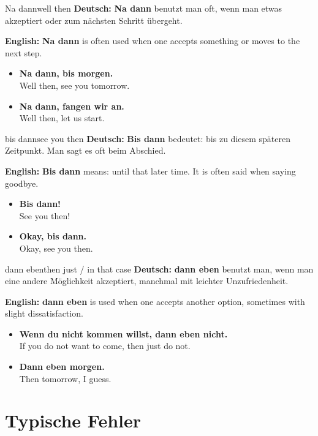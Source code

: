 \documentclass[a4paper,11pt]{article}
\newcommand{\GermanText}[1]{\textbf{Deutsch: }#1\par}
\newcommand{\EnglishText}[1]{{\small\color{SoftGray}\textbf{English: }#1\par}}
\newcommand{\ExampleItem}[2]{\item \textbf{#1}\\{\small\color{SoftGray}#2}}
\begin{document}
\begin{grammarentry}{Na dann}{well then}
\GermanText{\textbf{Na dann} benutzt man oft, wenn man etwas akzeptiert oder zum nächsten Schritt übergeht.}
\EnglishText{\textbf{Na dann} is often used when one accepts something or moves to the next step.}

\begin{exbox}
\begin{itemize}
    \ExampleItem{Na dann, bis morgen.}{Well then, see you tomorrow.}
    \ExampleItem{Na dann, fangen wir an.}{Well then, let us start.}
\end{itemize}
\end{exbox}
\end{grammarentry}

\begin{grammarentry}{bis dann}{see you then}
\GermanText{\textbf{Bis dann} bedeutet: bis zu diesem späteren Zeitpunkt. Man sagt es oft beim Abschied.}
\EnglishText{\textbf{Bis dann} means: until that later time. It is often said when saying goodbye.}

\begin{exbox}
\begin{itemize}
    \ExampleItem{Bis dann!}{See you then!}
    \ExampleItem{Okay, bis dann.}{Okay, see you then.}
\end{itemize}
\end{exbox}
\end{grammarentry}

\begin{grammarentry}{dann eben}{then just / in that case}
\GermanText{\textbf{dann eben} benutzt man, wenn man eine andere Möglichkeit akzeptiert, manchmal mit leichter Unzufriedenheit.}
\EnglishText{\textbf{dann eben} is used when one accepts another option, sometimes with slight dissatisfaction.}

\begin{exbox}
\begin{itemize}
    \ExampleItem{Wenn du nicht kommen willst, dann eben nicht.}{If you do not want to come, then just do not.}
    \ExampleItem{Dann eben morgen.}{Then tomorrow, I guess.}
\end{itemize}
\end{exbox}
\end{grammarentry}

\section{Typische Fehler}
\end{document}
